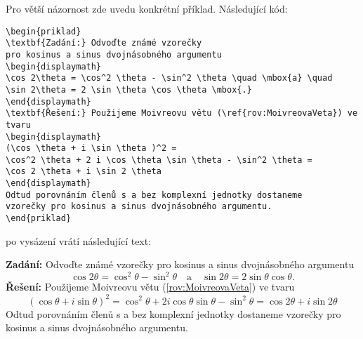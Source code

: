 Pro větší názornost zde uvedu konkrétní příklad. Následující kód:
\begin{verbatim}
\begin{priklad}
\textbf{Zadání:} Odvoďte známé vzorečky
pro kosinus a sinus dvojnásobného argumentu
\begin{displaymath}
\cos 2\theta = \cos^2 \theta - \sin^2 \theta \quad \mbox{a} \quad
\sin 2\theta = 2 \sin \theta \cos \theta \mbox{.}
\end{displaymath}
\textbf{Řešení:} Použijeme Moivreovu větu (\ref{rov:MoivreovaVeta}) ve tvaru
\begin{displaymath}
(\cos \theta + i \sin \theta )^2 =
\cos^2 \theta + 2 i \cos \theta \sin \theta - \sin^2 \theta =
\cos 2 \theta + i \sin 2 \theta
\end{displaymath}
Odtud porovnáním členů s a bez komplexní jednotky dostaneme
vzorečky pro kosinus a sinus dvojnásobného argumentu.
\end{priklad}
\end{verbatim}
po vysázení vrátí následující text:
\begin{priklad}
\textbf{Zadání:} Odvoďte známé vzorečky pro kosinus a sinus dvojnásobného argumentu
\begin{displaymath}
\cos 2\theta = \cos^2 \theta - \sin^2 \theta \quad \mbox{a} \quad
\sin 2\theta = 2 \sin \theta \cos \theta \mbox{.}
\end{displaymath}
\textbf{Řešení:} Použijeme Moivreovu větu (\ref{rov:MoivreovaVeta}) ve tvaru
\begin{displaymath}
(\cos \theta + i \sin \theta )^2 = \cos^2 \theta + 2 i \cos \theta \sin \theta - \sin^2 \theta = \cos 2 \theta + i \sin 2 \theta
\end{displaymath}
Odtud porovnáním členů s a bez komplexní jednotky dostaneme vzorečky pro kosinus a sinus dvojnásobného argumentu.
\end{priklad}

